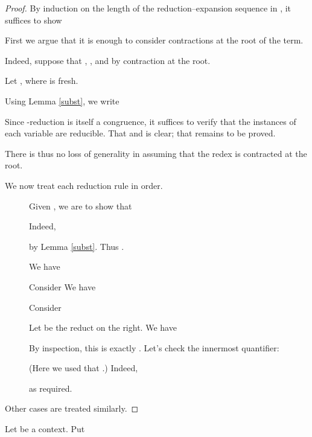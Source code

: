 \documentclass[10pt]{article}
\newcommand{\ul}[1]{\underline{#1}}
\newenvironment{definition}{{\sc Definition.}}{}
\newenvironment{theorem}{{\sc Theorem.}}{}
\begin{document}
\begin{proof}
By induction on the length of the reduction--expansion sequence in
  , it suffices to show
  

First we argue that it is enough to consider contractions at the root
of the term.

Indeed, suppose that , , and  by
contraction
at the root.

Let , where  is fresh.

Using Lemma \ref{subst}, we write

Since -reduction is itself a congruence, it suffices to verify
that the instances of each variable are reducible.  That  and 
is clear; that  remains to be proved.

There is thus no loss of generality in assuming that the
redex is contracted at the root.

We now treat each reduction rule in order.

\newcommand{\st}{.\hspace{0.5em}}
\begin{description}
\item[\underline{}] Given , we are to show that

Indeed,

by Lemma \ref{subst}.  Thus .
\item[\underline{}] We have
  
\item[\underline{}] Consider 
We have 

\item[\ul{}]  Consider

Let  be the reduct on the right.  We have

By inspection, this is exactly .  Let's check the innermost
quantifier:

(Here we used that .)
Indeed,

as required.
\end{description}
Other cases are treated similarly.
\end{proof}

\begin{definition}
  Let 
be a context.  Put

\end{definition}

\newpage
\begin{theorem}
\qquad\qquad
\end{theorem}
\end{document}
